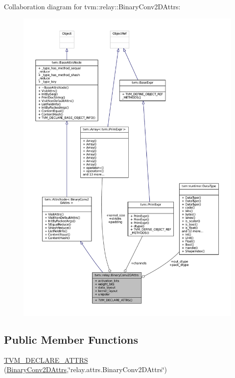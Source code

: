 Collaboration diagram for tvm\+:\+:relay\+:\+:Binary\+Conv2\+D\+Attrs\+:
\nopagebreak
\begin{figure}[H]
\begin{center}
\leavevmode
\includegraphics[width=350pt]{structtvm_1_1relay_1_1BinaryConv2DAttrs__coll__graph}
\end{center}
\end{figure}
\subsection*{Public Member Functions}
\begin{DoxyCompactItemize}
\item 
\hyperlink{structtvm_1_1relay_1_1BinaryConv2DAttrs_a089de256c5f5f8de8701b7445cf1fd5a}{T\+V\+M\+\_\+\+D\+E\+C\+L\+A\+R\+E\+\_\+\+A\+T\+T\+RS} (\hyperlink{structtvm_1_1relay_1_1BinaryConv2DAttrs}{Binary\+Conv2\+D\+Attrs},\char`\"{}relay.\+attrs.\+Binary\+Conv2\+D\+Attrs\char`\"{})
\end{DoxyCompactItemize}

